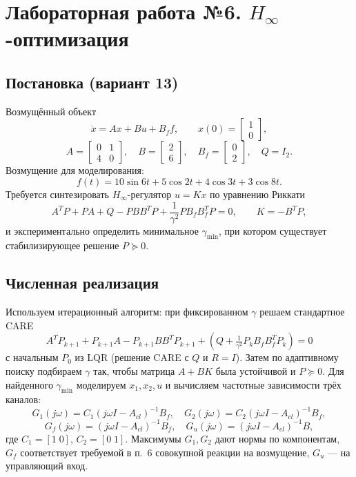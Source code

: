\chapter{Лабораторная работа №6. $H_{\infty}$-оптимизация}

\section*{Постановка (вариант 13)}
Возмущённый объект
\[
\dot x = A x + B u + B_f f,\qquad x(0)=\begin{bmatrix}1\\0\end{bmatrix},
\]
\[
A=\begin{bmatrix}0&1\\4&0\end{bmatrix},\quad B=\begin{bmatrix}2\\6\end{bmatrix},\quad B_f=\begin{bmatrix}0\\2\end{bmatrix},\quad Q=I_2.
\]
Возмущение для моделирования:
\[
 f(t)=10\sin 6t+5\cos 2t+4\cos 3t+3\cos 8t.
\]
Требуется синтезировать $H_{\infty}$-регулятор $u=Kx$ по уравнению Риккати
\[
A^T P + P A + Q - P B B^T P + \frac{1}{\gamma^2} P B_f B_f^T P = 0,\qquad K=-B^T P,
\]
и экспериментально определить минимальное $\gamma_{\min}$, при котором существует стабилизирующее решение $P\succeq0$.

\section{Численная реализация}
Используем итерационный алгоритм: при фиксированном $\gamma$ решаем стандартное CARE
\[
A^T P_{k+1}+P_{k+1}A - P_{k+1} B B^T P_{k+1} + (Q + \tfrac{1}{\gamma^2} P_k B_f B_f^T P_k)=0
\]
с начальным $P_0$ из LQR (решение CARE с $Q$ и $R=I$). Затем по адаптивному поиску подбираем $\gamma$ так, чтобы матрица $A+BK$ была устойчивой и $P\succeq0$. Для найденного $\gamma_{\min}$ моделируем $x_1,x_2,u$ и вычисляем частотные зависимости трёх каналов:
\[
G_1(j\omega)=C_1(j\omega I-A_{cl})^{-1}B_f,\quad
G_2(j\omega)=C_2(j\omega I-A_{cl})^{-1}B_f,
\]
\[
G_f(j\omega)=(j\omega I-A_{cl})^{-1}B_f,\quad
G_u(j\omega)=(j\omega I-A_{cl})^{-1}B,
\]
где $C_1=[1\;0]$, $C_2=[0\;1]$. Максимумы $G_1,G_2$ дают нормы по компонентам, $G_f$ соответствует требуемой в п.~6 совокупной реакции на возмущение, $G_u$ — на управляющий вход.

